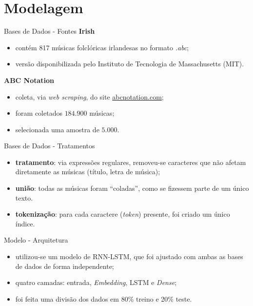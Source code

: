 \documentclass{beamer}
\begin{document}
\section{Modelagem}
    \begin{frame}{Bases de Dados - Fontes}
        \textbf{Irish}
        \begin{itemize}
            \justifying
            \item contém 817 músicas folclóricas irlandesas no formato \textit{.abc};
            \item versão disponibilizada pelo Instituto de Tecnologia de Massachusetts (MIT).
        \end{itemize}
        
        \textbf{ABC Notation}
        \begin{itemize}
            \justifying
            \item coleta, via \textit{web scraping}, do site \href{https://abcnotation.com/}{abcnotation.com};
            \item foram coletados $184.900$ músicas;
            \item selecionada uma amostra de $5.000$.
        \end{itemize}
    \end{frame}

    \begin{frame}{Bases de Dados - Tratamentos}
        \begin{itemize}
            \justifying
            \item \textbf{tratamento}: via expressões regulares, removeu-se caracteres que não afetam diretamente as músicas (título, letra de música);
            \item \textbf{união}: todas as músicas foram ``coladas'', como se fizessem parte de um único texto.
            \item \textbf{tokenização}: para cada caractere (\textit{token}) presente, foi criado um único índice.
        \end{itemize}
    \end{frame}

    \begin{frame}{Modelo - Arquitetura}
        \begin{itemize}
            \justifying
            \item utilizou-se um modelo de RNN-LSTM, que foi ajustado com ambas as bases de dados de forma independente;
            \item quatro camadas: entrada, \textit{Embedding}, LSTM e \textit{Dense};
            \item foi feita uma divisão dos dados em 80\% treino e 20\% teste.
        \end{itemize}
    \end{frame}
\end{document}
